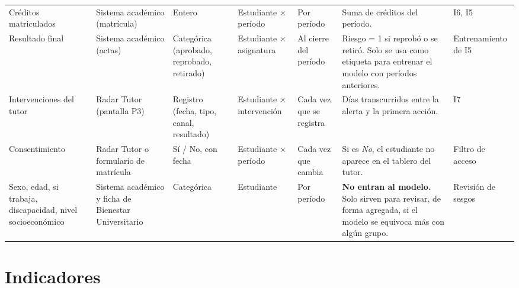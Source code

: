 \documentclass[10pt]{article}
\begin{document}
{\begin{longtable}{P{3.2cm} P{3.4cm} P{2.3cm} P{2.8cm} P{2.6cm} P{6.2cm} P{3.0cm}}
Créditos matriculados & Sistema académico (matrícula) & Entero & Estudiante $\times$ período & Por período & Suma de créditos del período. & I6, I5\\
Resultado final & Sistema académico (actas) & Categórica (aprobado, reprobado, retirado) & Estudiante $\times$ asignatura & Al cierre del período & Riesgo = 1 si reprobó o se retiró. Solo se usa como etiqueta para entrenar el modelo con períodos anteriores. & Entrenamiento de I5\\
Intervenciones del tutor & Radar Tutor (pantalla P3) & Registro (fecha, tipo, canal, resultado) & Estudiante $\times$ intervención & Cada vez que se registra & Días transcurridos entre la alerta y la primera acción. & I7\\
Consentimiento & Radar Tutor o formulario de matrícula & Sí / No, con fecha & Estudiante $\times$ período & Cada vez que cambia & Si es \emph{No}, el estudiante no aparece en el tablero del tutor. & Filtro de acceso\\
Sexo, edad, si trabaja, discapacidad, nivel socioeconómico & Sistema académico y ficha de Bienestar Universitario & Categórica & Estudiante & Por período & \textbf{No entran al modelo.} Solo sirven para revisar, de forma agregada, si el modelo se equivoca más con algún grupo. & Revisión de sesgos\\
\end{longtable}
}

\section{Indicadores}
\end{document}
